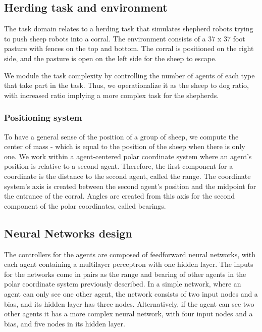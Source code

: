 \documentclass[conference]{IEEEtran}
\begin{document}

 
\subsection{Herding task and environment}
\label{sec:herding_task_environment}
The task domain relates to a herding task that simulates shepherd robots trying to push sheep robots into a corral. The environment consists of a 37 x 37 foot pasture with fences on the top and bottom. The corral is positioned on the right side, and the pasture is open on the left side for the sheep to escape.

We module the task complexity by controlling the number of agents of each type that take part in the task. Thus, we operationalize it as the sheep to dog ratio, with increased ratio implying a more complex task for the shepherds.


\subsubsection{Positioning system}
\label{sec:positioning_system}
To have a general sense of the position of a group of sheep, we compute the center of mass - which is equal to the position of the sheep when there is only one.
We work within a agent-centered polar coordinate system where an agent's position is relative to a second agent. 
Therefore, the first component for a coordinate is the distance to the second agent, called the range. 
The coordinate system's axis is created between the second agent's position and the midpoint for the entrance of the corral. 
Angles are created from this axis for the second component of the polar coordinates, called bearings. 

\subsection{Neural Networks design}
\label{sec:NN_design}
The controllers for the agents are composed of feedforward neural networks, with each agent containing a multilayer perceptron with one hidden layer. 
The inputs for the networks come in pairs as the range and bearing of other agents in the polar coordinate system previously described. 
In a simple network, where an agent can only see one other agent, the network consists of two input nodes and a bias, and its hidden layer has three nodes. 
Alternatively, if the agent can see two other agents it has a more complex neural network, with four input nodes and a bias, and five nodes in its hidden layer. 
\end{document}
